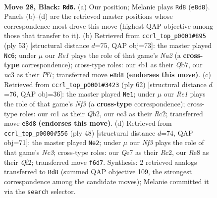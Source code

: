 \documentclass[11pt]{article}
\begin{document}
\clearpage

\begin{figure}[p]\centering
\begin{subfigure}{0.46\textwidth}\centering
\resizebox{\linewidth}{!}{%
\newchessgame
\chessboard[
  setfen={1n2r1k1/4q1p1/rp1ppn2/4p2p/P3P2N/2N3P1/2P2P1P/1RR1Q1K1 b - - 1 28},
  showmover=false,
  pgfstyle=straightmove, color=movearrow, markmove={e8-d8}
]}
\caption{}
\end{subfigure}\hfill
\begin{subfigure}{0.46\textwidth}\centering
\resizebox{\linewidth}{!}{%
\newchessgame
\chessboard[
  setfen={r3r1k1/nq1p1ppp/1p3n2/2p5/4P3/1NNQ2P1/PP3PKP/3RR3 b - - 20 27},
  showmover=false,
  pgfstyle=straightmove, color=movearrow, markmove={a7-c6}
]}
\caption{}
\end{subfigure}
\\[4pt]
\begin{subfigure}{0.46\textwidth}\centering
\resizebox{\linewidth}{!}{%
\newchessgame
\chessboard[
  setfen={2r3k1/p1r2p2/2bq1np1/2pp3p/8/1PN1PN1P/PQR2PP1/3R2K1 w - - 6 32},
  showmover=false,
  pgfstyle=straightmove, color=movearrow, markmove={f3-e1}
]}
\caption{}
\end{subfigure}\hfill
\begin{subfigure}{0.46\textwidth}\centering
\resizebox{\linewidth}{!}{%
\newchessgame
\chessboard[
  setfen={1r1q2k1/3r1ppp/3ppn2/1p6/4P3/P1N2P1P/1PR2QP1/3R2K1 w - - 0 25},
  showmover=false,
  pgfstyle=straightmove, color=movearrow, markmove={c3-e2}
]}
\caption{}
\end{subfigure}
\caption{\textbf{Move 28, Black: \texttt{Rd8}.} (a) Our position; Melanie plays \texttt{Rd8} (\texttt{e8d8}). Panels (b)--(d) are the retrieved master positions whose correspondence most drove this move (highest QAP objective among those that transfer to it). (b) Retrieved from \texttt{ccrl\_top\_p0001\#895} (ply 53) [structural distance $d$=75, QAP obj=73]: the master played \texttt{Nc6}; under $\mu$ our \emph{Re1} plays the role of that game's \emph{Na2} (a \textbf{cross-type} correspondence); cross-type roles: our \emph{r}b1 as their \emph{Q}b7, our \emph{n}c3 as their \emph{P}f7; transferred move \texttt{e8d8} \textbf{(endorses this move)}. (c) Retrieved from \texttt{ccrl\_top\_p0001\#3423} (ply 62) [structural distance $d$=76, QAP obj=36]: the master played \texttt{Ne1}; under $\mu$ our \emph{Re1} plays the role of that game's \emph{Nf3} (a \textbf{cross-type} correspondence); cross-type roles: our \emph{r}c1 as their \emph{Q}b2, our \emph{n}c3 as their \emph{R}c2; transferred move \texttt{e8d8} \textbf{(endorses this move)}. (d) Retrieved from \texttt{ccrl\_top\_p0000\#556} (ply 48) [structural distance $d$=74, QAP obj=71]: the master played \texttt{Ne2}; under $\mu$ our \emph{Nf3} plays the role of that game's \emph{Nc3}; cross-type roles: our \emph{Q}e7 as their \emph{R}c2, our \emph{R}e8 as their \emph{Q}f2; transferred move \texttt{f6d7}. Synthesis: 2 retrieved analogs transferred to \texttt{Rd8} (summed QAP objective 109, the strongest correspondence among the candidate moves); Melanie committed it via the \texttt{search} selector.}
\label{fig:thought-m55}
\end{figure}
\end{document}
